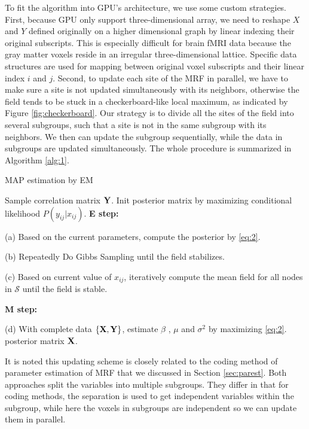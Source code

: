 To fit the algorithm into GPU's architecture, we use some custom
strategies. First, because GPU only support three-dimensional array, we need to
reshape $X$ and $Y$ defined originally on a higher dimensional graph by linear
indexing their original subscripts. This is especially difficult for brain fMRI
data because the gray matter voxels reside in an irregular three-dimensional lattice. Specific
data structures are used for mapping between original voxel subscripts and their
linear index $i$ and $j$. Second, to update each site of the MRF in parallel, we
have to make sure a site is not updated simultaneously with its neighbors,
otherwise the field tends to be stuck in a checkerboard-like local maximum, as
indicated by Figure \ref{fig:checkerboard}.  Our strategy is to divide all the
sites of the field into several subgroups, such that a site is not in the same
subgroup with its neighbors.  We then can update the subgroup sequentially,
while the data in subgroups are updated simultaneously. The whole procedure is
summarized in Algorithm \ref{alg:1}.


\begin{algorithm}[p]
  \caption{MAP estimation by EM}
  \label{alg:1}
  \begin{algorithmic}
    \REQUIRE Sample correlation matrix $\text{\bf Y}$.
    \STATE Init posterior matrix by maximizing conditional likelihood
    $P(y_{ij}|x_{ij})$.  
    \STATE \textbf{E step: }

    (a) Based on the current
    parameters, compute the posterior by \eqref{eq:2}.

    (b) Repeatedly Do Gibbs Sampling until the field  stabilizes.

    (c) Based on current value of $x_{ij}$, iteratively compute the mean
    field for all nodes in $\mathcal{S}$ until the field is stable.

    \STATE \textbf{M step: } 

    (d) With complete data $\{\text{\bf X}, \text{\bf Y}\}$, estimate $\beta$ , $\mu$ and $\sigma^2$ by maximizing
    \eqref{eq:2}.
    \ENDWHILE
    \RETURN posterior matrix $\text{\bf X}$.
  \end{algorithmic}
\end{algorithm}

It is noted this updating scheme is closely related to the coding method of
parameter estimation of MRF that we discussed in Section \ref{sec:parest}. Both
approaches split the variables into multiple subgroups. They differ in that
for coding methods, the separation is used to get independent variables within
the subgroup, while here the voxels in subgroups are independent so we can
update them in parallel.


